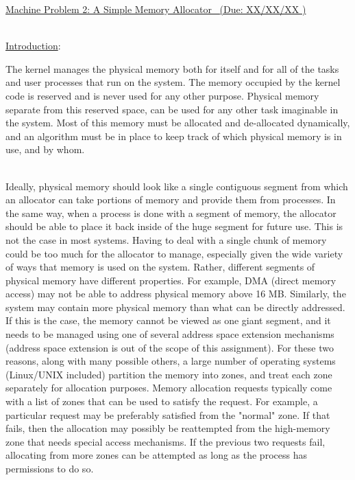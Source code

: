 \documentclass[12pt]{extarticle}
\newenvironment{myindentpar}[1]%
 {\begin{list}{}%
         {\setlength{\leftmargin}{#1}}%
         \item[]%
 }
 {\end{list}}
\newcommand{\duedate}{XX/XX/XX }
\begin{document}
\begin{center}
    \underline{{\large Machine Problem 2: A Simple Memory Allocator \  }(Due: \duedate)}  \\
\end{center}


\ \\
{\large \underline{Introduction}:}

\begin{myindentpar}{6.5mm}

    \noindent
    The kernel manages the physical memory both for itself and for all of the tasks and user processes that run on the system.  The memory occupied by the kernel code is reserved and is never used for any other purpose.  Physical memory separate from this reserved space, can be used for any other task imaginable in the system.  Most of this memory must be allocated and de-allocated dynamically, and an algorithm must be in place to keep track of which physical memory is in use, and by whom.  
    
    \ \\
    Ideally, physical memory should look like a single contiguous segment from which an allocator can take portions of memory and provide them from processes.  In the same way, when a process is done with a segment of memory, the allocator should be able to place it back inside of the huge segment for future use.  This is not the case in most systems.  Having to deal with a single chunk of memory could be too much for the allocator to manage, especially given the wide variety of ways that memory is used on the system.  Rather, different segments of physical memory have different properties.  For example, DMA (direct memory access) may not be able to address physical memory above 16 MB.  Similarly, the system may contain more physical memory than what can be directly addressed.  If this is the case, the memory cannot be viewed as one giant segment, and it needs to be managed using one of several address space extension mechanisms (address space extension is out of the scope of this assignment).  For these two reasons, along with many possible others, a large number of operating systems (Linux/UNIX included) partition the memory into zones, and treat each zone separately for allocation purposes.  Memory allocation requests typically come with a list of zones that can be used to satisfy the request.  For example, a particular request may be preferably satisfied from the "normal" zone.  If that fails, then the allocation may possibly be reattempted from the high-memory zone that needs special access mechanisms.  If the previous two requests fail, allocating from more zones can be attempted as long as the process has permissions to do so.  
    

\end{myindentpar}
\end{document}
